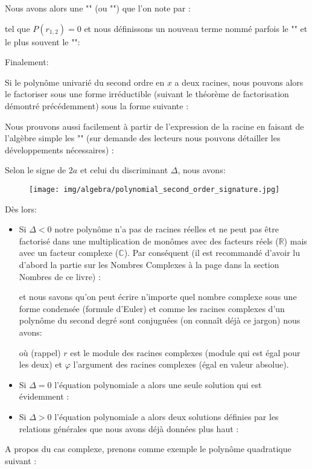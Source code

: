 	Nous avons alors une "\label{double root}" (ou "") que l'on note par :
	
	tel que $P(r_{1,2})=0$ et nous définissons un nouveau terme nommé parfois le "" et le plus souvent le "\label{discriminant}":
		
	Finalement\label{second order polynomial roots}:
	
	Si le polynôme univarié du second ordre en $x$ a deux racines, nous pouvons alors le factoriser sous une forme irréductible (suivant le théorème de factorisation démontré précédemment) sous la forme suivante :
	
	Nous prouvons aussi facilement à partir de l'expression de la racine en faisant de l'algèbre simple les "\label{vieta relations}" (sur demande des lecteurs nous pouvons détailler les développements nécessaires) :
	
	Selon le signe de $2a$ et celui du discriminant $\Delta$, nous avons:
	\begin{figure}[H]
		\centering
		\texttt{[image: img/algebra/polynomial\_second\_order\_signature.jpg]}
	\end{figure}
	Dès lors:
	\begin{itemize}
		\item Si $\Delta<0$ notre polynôme n'a pas de racines réelles et ne peut pas être factorisé dans une multiplication de monômes avec des facteurs réels ($
\mathbb{R}$) mais avec un facteur complexe ($\mathbb{C}$). Par conséquent (il est recommandé d'avoir lu d'abord la partie sur les Nombres Complexes à la page 	\pageref{complex numbers} dans la section Nombres de ce livre) :
		
		et nous savons qu'on peut écrire n'importe quel nombre complexe sous une forme condensée (formule d'Euler) et comme les racines complexes d'un polynôme du second degré sont conjuguées (on connaît déjà ce jargon) nous avons:
		
		où (rappel) $r$ est le module des racines complexes (module qui est égal pour les deux) et $\varphi$ l'argument des racines complexes (égal en valeur absolue).
		
		\item Si $\Delta=0$ l'équation polynomiale a alors une seule solution qui est évidemment :
		
		
		\item Si $\Delta>0$ l'équation polynomiale a alors deux solutions définies par les relations générales que nous avons déjà données plus haut :
		
	\end{itemize}
	A propos du cas complexe, prenons comme exemple le polynôme quadratique suivant :
	
